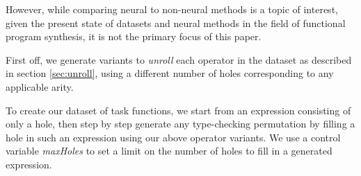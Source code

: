 \documentclass{article}
\begin{document}
However, while comparing neural to non-neural methods is a topic of interest,
given the present state of datasets and neural methods in the field of functional program synthesis,
it is not the primary focus of this paper.



First off, we generate variants to \emph{unroll} each operator in the dataset
as described in section \ref{sec:unroll},
using a different number of holes corresponding to any applicable arity.


To create our dataset of task functions,
we start from an expression consisting of only a hole,
then step by step generate any type-checking permutation
by filling a hole in such an expression using our above operator variants.
We use a control variable \emph{maxHoles} to set a limit on
the number of holes to fill in a generated expression.
\end{document}
